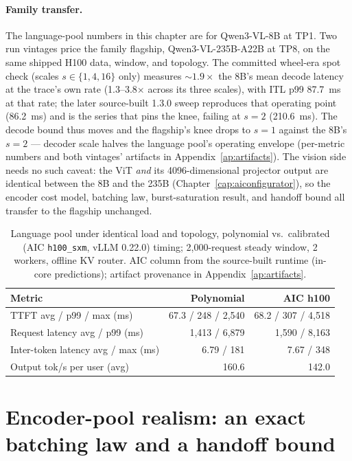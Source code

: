 \paragraph{Family transfer.} The language-pool numbers in this chapter are
for Qwen3-VL-8B at TP1. Two run vintages price the family flagship,
Qwen3-VL-235B-A22B at TP8, on the same shipped H100 data, window, and
topology. The committed wheel-era spot check (scales $s\in\{1,4,16\}$
only) measures ${\sim}1.9\times$ the 8B's mean decode latency at the
trace's own rate (1.3--3.8$\times$ across its three scales), with ITL
p99 \SI{87.7}{\milli\second} at that rate; the later source-built 1.3.0
sweep reproduces that operating point (\SI{86.2}{\milli\second}) and is
the series that pins the knee, failing at $s{=}2$
(\SI{210.6}{\milli\second}). The decode bound thus moves and the
flagship's knee drops to $s{=}1$ against the 8B's $s{=}2$ ---
decoder scale halves the language pool's operating envelope (per-metric
numbers and both vintages' artifacts in Appendix~\ref{ap:artifacts}). The vision
side needs no such caveat: the ViT \emph{and} its 4096-dimensional projector
output are identical between the 8B and the 235B
(Chapter~\ref{cap:aiconfigurator}), so the encoder cost model, batching
law, burst-saturation result, and handoff bound all transfer to the
flagship unchanged.

\begin{table}[htbp]
\centering
\caption{Language pool under identical load and topology, polynomial vs.\
calibrated (AIC \texttt{h100\_sxm}, vLLM 0.22.0) timing; 2{,}000-request
steady window, 2 workers, offline KV router. AIC column from the
source-built runtime (in-core predictions); artifact provenance in
Appendix~\ref{ap:artifacts}.}
\label{tab:sim-poly-aic}
\small
\begin{tabular}{lrr}
\toprule
Metric & Polynomial & AIC h100 \\
\midrule
TTFT avg / p99 / max (ms) & 67.3 / 248 / 2{,}540 & 68.2 / 307 / 4{,}518 \\
Request latency avg / p99 (ms) & 1{,}413 / 6{,}879 & 1{,}590 / 8{,}163 \\
Inter-token latency avg / max (ms) & 6.79 / 181 & 7.67 / 348 \\
Output tok/s per user (avg) & 160.6 & 142.0 \\
\bottomrule
\end{tabular}
\end{table}

{\renewcommand{\sectionmark}[1]{}%
\section{Encoder-pool realism: an exact batching law and a handoff bound}%
\label{sec:sim-encoder}}

